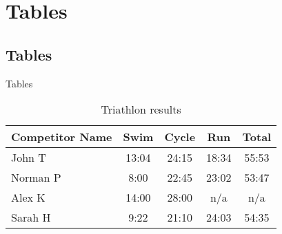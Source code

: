\section{Tables}
\subsection{Tables}
\label{tables}
\begin{frame}{Tables}
  \begin{table}
    \begin{tabular}{l | c | c | c | c }
      Competitor Name & Swim & Cycle & Run & Total \\
      \hline \hline
      John T & 13:04 & 24:15 & 18:34 & 55:53 \\
      Norman P & 8:00 & 22:45 & 23:02 & 53:47\\
      Alex K & 14:00 & 28:00 & n/a & n/a\\
      Sarah H & 9:22 & 21:10 & 24:03 & 54:35
    \end{tabular}
    \caption{Triathlon results}
  \end{table}
\end{frame}
